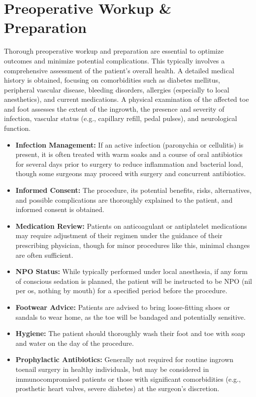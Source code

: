 \section*{Preoperative Workup \& Preparation}
Thorough preoperative workup and preparation are essential to optimize outcomes and minimize potential complications. This typically involves a comprehensive assessment of the patient's overall health. A detailed medical history is obtained, focusing on comorbidities such as diabetes mellitus, peripheral vascular disease, bleeding disorders, allergies (especially to local anesthetics), and current medications. A physical examination of the affected toe and foot assesses the extent of the ingrowth, the presence and severity of infection, vascular status (e.g., capillary refill, pedal pulses), and neurological function.

\begin{itemize}
  \item  \textbf{Infection Management:} If an active infection (paronychia or cellulitis) is present, it is often treated with warm soaks and a course of oral antibiotics for several days prior to surgery to reduce inflammation and bacterial load, though some surgeons may proceed with surgery and concurrent antibiotics.
  \item  \textbf{Informed Consent:} The procedure, its potential benefits, risks, alternatives, and possible complications are thoroughly explained to the patient, and informed consent is obtained.
  \item  \textbf{Medication Review:} Patients on anticoagulant or antiplatelet medications may require adjustment of their regimen under the guidance of their prescribing physician, though for minor procedures like this, minimal changes are often sufficient.
  \item  \textbf{NPO Status:} While typically performed under local anesthesia, if any form of conscious sedation is planned, the patient will be instructed to be NPO (nil per os, nothing by mouth) for a specified period before the procedure.
  \item  \textbf{Footwear Advice:} Patients are advised to bring loose-fitting shoes or sandals to wear home, as the toe will be bandaged and potentially sensitive.
  \item  \textbf{Hygiene:} The patient should thoroughly wash their foot and toe with soap and water on the day of the procedure.
  \item  \textbf{Prophylactic Antibiotics:} Generally not required for routine ingrown toenail surgery in healthy individuals, but may be considered in immunocompromised patients or those with significant comorbidities (e.g., prosthetic heart valves, severe diabetes) at the surgeon's discretion.
\end{itemize}

